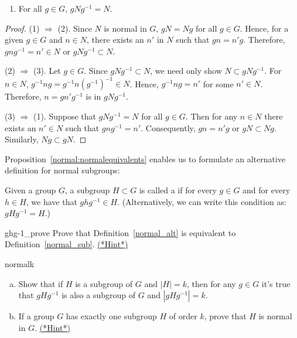 {\begin{thm}
\begin{enumerate}
\item
For all $g \in G$, $gNg^{-1} = N$.
 
\end{enumerate}
\end{thm}
 
 
\begin{proof}
(1) $\Rightarrow$ (2).
Since $N$ is normal in $G$, $gN = Ng$ for all $g \in G$. Hence, for a
given $g \in G$ and $n \in N$, there exists an $n'$ in $N$ such that
$g n = n' g$. Therefore, $gng^{-1} = n' \in N$ or $gNg^{-1} \subset
N$.
 
 
(2)  $\Rightarrow$ (3).  
Let $g \in G$. Since $gNg^{-1} \subset N$, we need only show $N
\subset gNg^{-1}$. For $n \in N$,  $g^{-1}ng=g^{-1}n(g^{-1})^{-1} \in
N$.  Hence, $g^{-1}ng = n'$ for some $n' \in N$. Therefore, $n = g n'
g^{-1}$ is in $g N g^{-1}$.
 
 
(3) $\Rightarrow$ (1).
Suppose that $gNg^{-1} = N$ for all $g \in G$. Then for any $n \in N$
there exists an $n' \in N$ such that $gng^{-1} = n'$.  Consequently,
$gn = n' g$ or $gN \subset Ng$. Similarly, $Ng \subset gN$.
\end{proof}
 
 Proposition~\ref{normal:normalequivalents} enables us to formulate an alternative definition for normal subgroups:  

\begin{defn}\label{normal_alt}
 Given a group $G$, a subgroup $H \subset G$ is called a 
 if for every $g \in G$ and for every $h \in H$, we have that $ghg^{-1} \in H$.  (Alternatively, we can write this condition as: $gHg^{-1} = H$.)
\end{defn}

\begin{exercise}{ghg-1_prove}
Prove that Definition~\ref{normal_alt} is equivalent to Definition~\ref{normal_sub}.
\hyperref[sec:cosets:hints]{(*Hint*)}
\end{exercise}


\begin{exercise}{normalk}
\begin{enumerate}[(a)]
\item
Show that if $H$ is a subgroup of $G$ and $|H|=k$, then for any $g \in G$ it's true that $gHg^{-1}$ is also a subgroup of $G$ and $|gHg^{-1}|=k$.
\item
If a group $G$ has exactly one subgroup $H$ of order $k$, prove that
$H$ is normal in $G$.
\hyperref[sec:cosets:hints]{(*Hint*)}
\end{enumerate}
\end{exercise}

}
